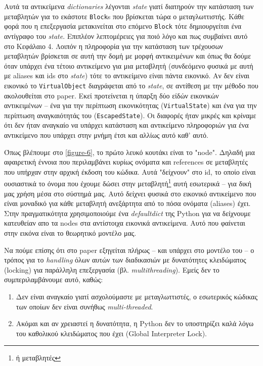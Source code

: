 Αυτά τα αντικείμενα \textit{dictionaries} λέγονται \textit{state} γιατί
διατηρούν την κατάσταση των μεταβλητών για το εκάστοτε \texttt{Block}s που
βρίσκεται τώρα ο μεταγλωττιστής. Κάθε φορά που η επεξεργασία μετακινείται στο
επόμενο \texttt{Block} τότε δημιουργείται ένα αντίγραφο του \textit{state}.
Επιπλέον λεπτομέρειες για ποιό λόγο και πως συμβαίνει αυτό στο Κεφάλαιο 4.
Λοιπόν η πληροφορία για την κατάσταση των τρέχουσων μεταβλητών βρίσκεται σε αυτή
την δομή με μορφή αντικειμένων και όπως θα δούμε όταν υπάρχει ένα τέτοιο
αντικείμενο για μια μεταβλητή (συνδεόμενο φυσικά με αυτή με aliases και ids στο
\textit{state}) τότε το αντικείμενο είναι πάντα εικονικό. Αν δεν είναι εικονικό
το \texttt{VirtualObject} διαγράφεται από το \textit{state}, σε αντίθεση με την
μέθοδο που ακολουθείται στο paper. Εκεί προτείνεται η ύπαρξη δύο είδών εικονικών
αντικειμένων – ένα για την περίπτωση εικονικότητας (\texttt{VirtualState}) και
ένα για την περίπτωση αναγκαιότητάς του (\texttt{EscapedState}). Οι διαφορές
ήταν μικρές και κρίναμε ότι δεν ήταν αναγκαίο να υπάρχει κατάσταση και
αντικείμενο πληροφοριών για ένα αντικείμενο που υπάρχει στην μνήμη έτσι και
αλλίως αυτό καθ' αυτό.

Όπως βλέπουμε στο \ref{figure-6}, το πρώτο λευκό κουτάκι είναι το "node". Δηλαδή
μια αφαιρετική έννοια που περιλαμβάνει κυρίως ονόματα και references σε
μεταβλητές που υπήρχαν στην αρχική έκδοση του κώδικα. Αυτά "δείχνουν" στο id, το
οποίο είναι ουσιαστικά το όνομα που έχουμε δώσει στην μεταβλητή\footnote{ή
μεταβλητές} αυτή εσωτερικά – για δική μας χρήση μέσα στο σύστημά μας. Αυτό
δείχνει φυσικά στο εικονικό αντικείμενο που είναι μοναδικό για κάθε μεταβλητή
ανεξάρτητα από το πόσα ονόματα (aliases) έχει. Στην πραγματικότητα
χρησιμοποιούμε ένα \textit{defaultdict} της Python για να δείχνουμε κατευθείαν
απο τα nodes στα αντίστοιχα εικονικά αντικείμενα. Αυτό που φαίνεται στην εικόνα
είναι το θεωρητικό μοντέλο μας.

Να πούμε επίσης ότι στο paper εξηγείται πλήρως – και υπάρχει στο μοντέλο του – ο
τρόπος για το \textit{handling} όλων αυτών των διαδικασιών με δυνατότητες
κλειδώματος (locking) για παράλληλη επεξεργασία (βλ. \textit{multithreading}).
Εμείς δεν το συμπεριλαμβάνουμε αυτό, καθώς:

\begin{enumerate}

\item Δεν είναι αναγκαίο γιατί ασχολούμαστε με μεταγλωττιστές, ο εσωτερικός
κώδικας των οποίων δεν είναι συνήθως \textit{multi-threaded}.

\item Ακόμαι και αν χρειαστεί η δυνατότητα, η Python δεν το υποστηρίζει καλά
λόγω του καθολικού κλειδώματος που έχει (Global Interpreter Lock).

\end{enumerate}

